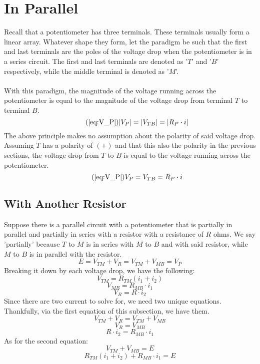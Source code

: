 \documentclass{article}
\begin{document}
	\section[Parallel]{In Parallel}
	Recall that a potentiometer has three terminals.  These terminals usually 
	form a linear array.  Whatever shape they form, let the paradigm be 
	such that the first and last terminals are the poles of the voltage drop 
	when the potentiometer is in a series circuit.  The first and last 
	terminals are denoted as '$T$' and '$B$' respectively, while the middle 
	terminal is denoted as '$M$'. \\ \\
	With this paradigm, the magnitude of the voltage running across the 
	potentiometer is equal to the magnitude of the voltage drop from terminal 
	$T$ to terminal $B$.
	\begin{equation}\tag{\ref{eq:V_P}}
		|V_P| = |V_{TB}| = |R_P \cdot i|
	\end{equation}
	The above principle makes no assumption about the polarity of said voltage 
	drop.  Assuming $T$ has a polarity of $(+)$ and that this also the 
	polarity in the previous sections, the voltage drop from $T$ to $B$ is 
	equal to the voltage running across the potentiometer.
	\begin{equation}\tag{\ref{eq:V_P}}
		V_P = V_{TB} = R_P \cdot i
	\end{equation}
	\subsection[Resistor]{With Another Resistor}
	Suppose there is a parallel circuit with a potentiometer that is partially 
	in parallel and partially in series with a resistor with a resistance of 
	$R$ ohms.  We say 'partially' because $T$ to $M$ is in series with $M$ to 
	$B$ and with said resistor, while $M$ to $B$ is in parallel with the 
	resistor.
	$$ E = V_{TM} + V_R = V_{TM} + V_{MB} = V_P$$
	Breaking it down by each voltage drop, we have the following:
	$$ V_{TM} = R_{TM}(i_1 + i_2)$$
	$$ V_{MB} = R_{MB}\cdot i_1$$
	$$ V_R = R \cdot i_2$$
	Since there are two current to solve for, we need two unique equations.  
	Thankfully, via the first equation of this subsection, we have them.
	$$ V_{TM} + V_R = V_{TM} + V_{MB}$$
	$$ V_R = V_{MB}$$
	\begin{equation}\label{eq:branch-cur-1}
		R \cdot i_2 = R_{MB} \cdot i_1
	\end{equation}
	As for the second equation:
	$$ V_{TM} + V_{MB} = E$$
	\begin{equation}\label{eq:branch-cur-2}
		R_{TM}(i_1 + i_2) + R_{MB}\cdot i_1 = E
	\end{equation}
\end{document}
